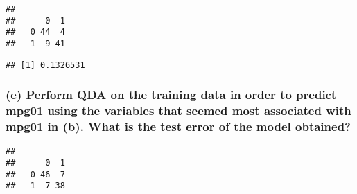\documentclass[
]{article}
\newenvironment{Shaded}{\begin{snugshade}}{\end{snugshade}}
\newcommand{\AttributeTok}[1]{\textcolor[rgb]{0.77,0.63,0.00}{#1}}
\newcommand{\FunctionTok}[1]{\textcolor[rgb]{0.00,0.00,0.00}{#1}}
\newcommand{\NormalTok}[1]{#1}
\newcommand{\OtherTok}[1]{\textcolor[rgb]{0.56,0.35,0.01}{#1}}
\newcommand{\SpecialCharTok}[1]{\textcolor[rgb]{0.00,0.00,0.00}{#1}}
\begin{document}
\begin{verbatim}
##    
##      0  1
##   0 44  4
##   1  9 41
\end{verbatim}

\begin{Shaded}
\end{Shaded}

\begin{verbatim}
## [1] 0.1326531
\end{verbatim}

\hypertarget{e-perform-qda-on-the-training-data-in-order-to-predict-mpg01-using-the-variables-that-seemed-most-associated-with-mpg01-in-b.-what-is-the-test-error-of-the-model-obtained}{%
\subsubsection{(e) Perform QDA on the training data in order to predict
mpg01 using the variables that seemed most associated with mpg01 in (b).
What is the test error of the model
obtained?}\label{e-perform-qda-on-the-training-data-in-order-to-predict-mpg01-using-the-variables-that-seemed-most-associated-with-mpg01-in-b.-what-is-the-test-error-of-the-model-obtained}}

\begin{Shaded}
\end{Shaded}

\begin{verbatim}
##    
##      0  1
##   0 46  7
##   1  7 38
\end{verbatim}

\begin{Shaded}
\end{Shaded}
\end{document}
